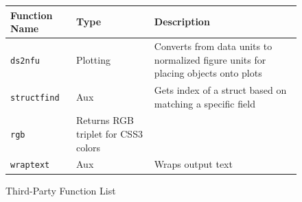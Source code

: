 \documentclass{article}
\begin{document}
\begin{figure}[h]
\caption{Third-Party Function List}
\begin{center}
\begin{tabular}{l p{1.5in} | p{3in}}
Function Name&Type&Description\\ \hline
\texttt{ds2nfu}&Plotting&Converts from data units to normalized figure units for placing objects onto plots\\
\texttt{structfind}&Aux&Gets index of a struct based on matching a specific field\\
\texttt{rgb}&Returns RGB triplet for CSS3 colors\\
\texttt{wraptext}&Aux&Wraps output text\\ 
\end{tabular}
\end{center}
\end{figure}
\end{document}
